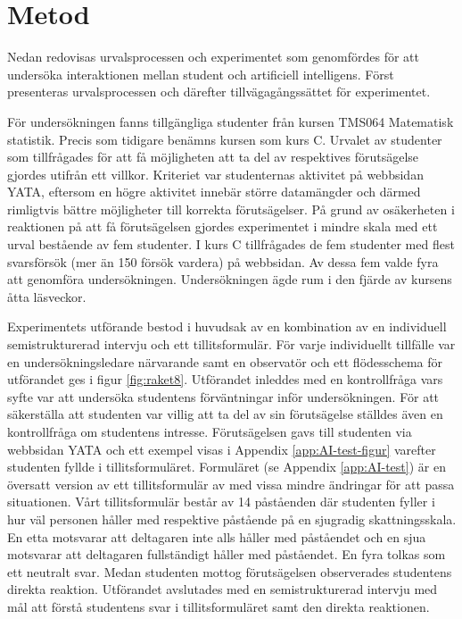 \section{Metod}
Nedan redovisas urvalsprocessen och experimentet som genomfördes för att undersöka interaktionen mellan student och artificiell intelligens. Först presenteras urvalsprocessen och därefter tillvägagångssättet för experimentet.

För undersökningen fanns tillgängliga studenter från kursen TMS064 Matematisk statistik. Precis som tidigare benämns kursen som kurs C. Urvalet av studenter som tillfrågades för att få möjligheten att ta del av respektives förutsägelse gjordes utifrån ett villkor. Kriteriet var studenternas aktivitet på webbsidan YATA, eftersom en högre aktivitet innebär större datamängder och därmed rimligtvis bättre möjligheter till korrekta förutsägelser. På grund av osäkerheten i reaktionen på att få förutsägelsen gjordes experimentet i mindre skala med ett urval bestående av fem studenter. I kurs C tillfrågades de fem studenter med flest svarsförsök (mer än 150 försök vardera) på webbsidan. Av dessa fem valde fyra att genomföra undersökningen. Undersökningen ägde rum i den fjärde av kursens åtta läsveckor.

Experimentets utförande bestod i huvudsak av en kombination av en individuell semistrukturerad intervju och ett tillitsformulär. För varje individuellt tillfälle var en undersökningsledare närvarande samt en observatör och ett flödesschema för utförandet ges i figur \ref{fig:raket8}. Utförandet inleddes med en kontrollfråga vars syfte var att undersöka studentens förväntningar inför undersökningen. För att säkerställa att studenten var villig att ta del av sin förutsägelse ställdes även en kontrollfråga om studentens intresse. Förutsägelsen gavs till studenten via webbsidan YATA och ett exempel visas i Appendix \ref{app:AI-test-figur} varefter studenten fyllde i tillitsformuläret. Formuläret (se Appendix \ref{app:AI-test}) är en översatt version av ett tillitsformulär av \cite{trust} med vissa mindre ändringar för att passa situationen. Vårt tillitsformulär består av 14 påståenden där studenten fyller i hur väl personen håller med respektive påstående på en sjugradig skattningsskala. En etta motsvarar att deltagaren inte alls håller med påståendet och en sjua motsvarar att deltagaren fullständigt håller med påståendet. En fyra tolkas som ett neutralt svar. Medan studenten mottog förutsägelsen observerades studentens direkta reaktion. Utförandet avslutades med en semistrukturerad intervju med mål att förstå studentens svar i tillitsformuläret samt den direkta reaktionen.

